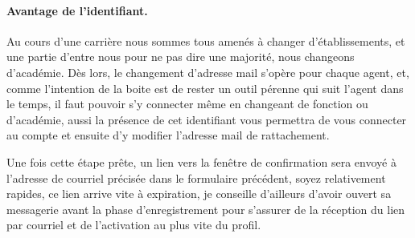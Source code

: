 \paragraph{Avantage de l'identifiant.} Au cours d'une carrière nous sommes tous amenés à changer d'établissements, et une partie d'entre nous pour ne pas dire une majorité, nous changeons d'académie. 
Dès lors, le changement d'adresse mail s'opère pour chaque agent, et, comme l'intention de la boite est de rester un outil pérenne qui suit l'agent dans le temps, il faut pouvoir s'y connecter même en changeant de fonction ou d'académie, aussi la présence de cet identifiant vous permettra de vous connecter au compte et ensuite d'y modifier l'adresse mail de rattachement.

Une fois cette étape prête, un lien vers la fenêtre de confirmation sera envoyé à l'adresse de courriel précisée dans le formulaire précédent, soyez relativement rapides, ce lien arrive vite à expiration, je conseille d'ailleurs d'avoir ouvert sa messagerie avant la phase d'enregistrement pour s'assurer de la réception du lien par courriel et de l'activation au plus vite du profil.

